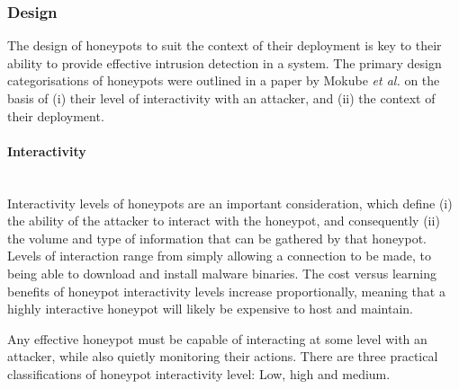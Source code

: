 \subsubsection{Design} \label{HoneypotDesignSoA}
The design of honeypots to suit the context of their deployment is key to their ability to provide effective intrusion detection in a system. The primary design categorisations of honeypots were outlined in a paper by Mokube \textit{et al.} \cite{Mokube:2007:HCA:1233341.1233399} on the basis of (i) their level of interactivity with an attacker, and (ii) the context of their deployment.

\paragraph{Interactivity} \label{HoneypotInteractivityLevels} \mbox{}\\ 
Interactivity levels of honeypots are an important consideration, which define (i) the ability of the attacker to interact with the honeypot, and consequently (ii) the volume and type of information that can be gathered by that honeypot. Levels of interaction range from simply allowing a connection to be made, to being able to download and install malware binaries. The cost versus learning benefits of honeypot interactivity levels increase proportionally, meaning that a highly interactive honeypot will likely be expensive to host and maintain. 

Any effective honeypot must be capable of interacting at some level with an attacker, while also quietly monitoring their actions. There are three practical classifications of honeypot interactivity level: Low, high and medium.

